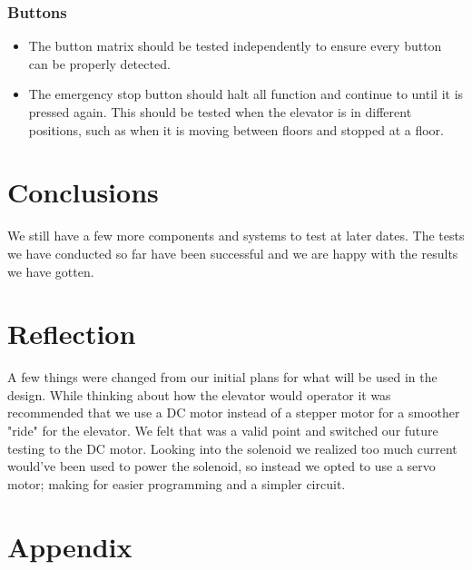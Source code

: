 \documentclass{article}
\begin{document}
	    \subsubsection{Buttons}
	    \begin{itemize}
	        \item The button matrix should be tested independently to ensure every button can be properly detected.
	        \item The emergency stop button should halt all function and continue to until it is pressed again. This should be tested when the elevator is in different positions, such as when it is moving between floors and stopped at a floor.
	    \end{itemize}
    \section{Conclusions}
    
    We still have a few more components and systems to test at later dates. The tests we have conducted so far have been successful and we are happy with the results we have gotten.
    
    \section{Reflection}
    
    A few things were changed from our initial plans for what will be used in the design. While thinking about how the elevator would operator it was recommended that we use a DC motor instead of a stepper motor for a smoother "ride" for the elevator. We felt that was a valid point and switched our future testing to the DC motor. Looking into the solenoid we realized too much current would've been used to power the solenoid, so instead we opted to use a servo motor; making for easier programming and a simpler circuit.
    
    \section{Appendix}
    
    
    
    
    
\end{document}
